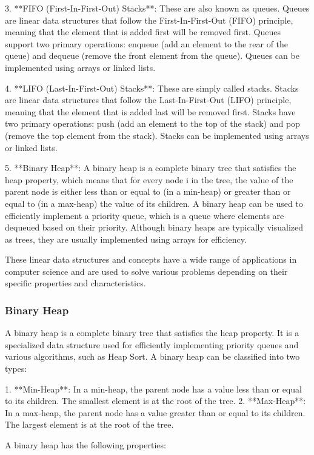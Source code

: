 \documentclass{article}
\begin{document}
3. **FIFO (First-In-First-Out) Stacks**: These are also known as queues. Queues are linear data structures that follow the First-In-First-Out (FIFO) principle, meaning that the element that is added first will be removed first. Queues support two primary operations: enqueue (add an element to the rear of the queue) and dequeue (remove the front element from the queue). Queues can be implemented using arrays or linked lists.

4. **LIFO (Last-In-First-Out) Stacks**: These are simply called stacks. Stacks are linear data structures that follow the Last-In-First-Out (LIFO) principle, meaning that the element that is added last will be removed first. Stacks have two primary operations: push (add an element to the top of the stack) and pop (remove the top element from the stack). Stacks can be implemented using arrays or linked lists.

5. **Binary Heap**: A binary heap is a complete binary tree that satisfies the heap property, which means that for every node i in the tree, the value of the parent node is either less than or equal to (in a min-heap) or greater than or equal to (in a max-heap) the value of its children. A binary heap can be used to efficiently implement a priority queue, which is a queue where elements are dequeued based on their priority. Although binary heaps are typically visualized as trees, they are usually implemented using arrays for efficiency.

These linear data structures and concepts have a wide range of applications in computer science and are used to solve various problems depending on their specific properties and characteristics.


\subsubsection{Binary Heap}

A binary heap is a complete binary tree that satisfies the heap property. It is a specialized data structure used for efficiently implementing priority queues and various algorithms, such as Heap Sort. A binary heap can be classified into two types:

1. **Min-Heap**: In a min-heap, the parent node has a value less than or equal to its children. The smallest element is at the root of the tree.
2. **Max-Heap**: In a max-heap, the parent node has a value greater than or equal to its children. The largest element is at the root of the tree.

A binary heap has the following properties:
\end{document}
